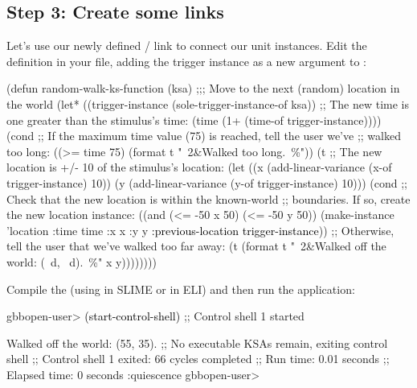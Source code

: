 \documentclass[10pt,twoside,english,pdftex]{article}
\begin{document}
\subsection*{Step 3: Create some links}

Let's use our newly defined / link
to connect our  unit instances.  Edit the
 definition in your 
file, adding the trigger instance as a new  argument
to :
%
\W\supp
\begin{example}
\textcolor{darkergray}{%
  (defun random-walk-ks-function (ksa)
    ;;; Move to the next (random) location in the world
    (let* ((trigger-instance (sole-trigger-instance-of ksa))
           ;; The new time is one greater than the stimulus's time:
           (time (1+ (time-of trigger-instance))))
      (cond
       ;; If the maximum time value (75) is reached, tell the user we've
       ;; walked too long:
       ((>= time 75) (format t "~2&Walked too long.~\%"))
       (t ;; The new location is +/- 10 of the stimulus's location:
        (let ((x (add-linear-variance (x-of trigger-instance) 10))
              (y (add-linear-variance (y-of trigger-instance) 10)))
          (cond
           ;; Check that the new location is within the known-world
           ;; boundaries.  If so, create the new location instance:
           ((and (<= -50 x 50) (<= -50 y 50))
            (make-instance 'location 
              :time time 
              :x x 
              :y y
              \textcolor{black}{:previous-location trigger-instance}))
           ;; Otherwise, tell the user that we've walked too far away:
           (t (format t "~2&Walked off the world: (~d, ~d).~\%" x y))))))))}
\end{example}

Compile the  (using  in SLIME or
 in ELI) and then run the application:
%
\W\supp
\begin{example}
\textcolor{darkergray}{%
  gbbopen-user> \textcolor{black}{(start-control-shell)}
  ;; Control shell 1 started

  Walked off the world: (55, 35).
  ;; No executable KSAs remain, exiting control shell
  ;; Control shell 1 exited: 66 cycles completed
  ;; Run time: 0.01 seconds
  ;; Elapsed time: 0 seconds
  :quiescence
  gbbopen-user>}
\end{example}
\end{document}
